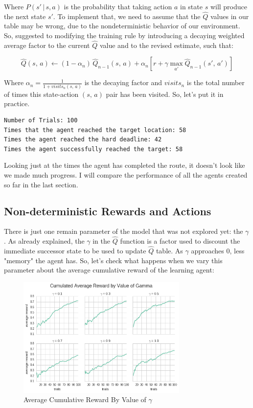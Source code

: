 \documentclass[a4paper]{article}
\begin{document}
Where $P\left(s' \,| \,s, a   \right)$ is the probability that taking action $a$ in state $s$ will produce the next state $s'$. To implement that, we need to assume that the $\hat{Q}$ values in our table may be wrong, due to the nondeterministic behavior of our environment. So, \cite{Mitchell} suggested to modifying the training rule by introducing a decaying weighted average factor to the current $\hat{Q}$ value and to the revised estimate, such that:

$$\hat{Q}(s, \, a) \leftarrow  (1 - \alpha_{n})\, \hat{Q}_{n-1}(s, \, a) +  \alpha_{n}\left[ r + \gamma \underset{a'}{\max} \hat{Q}_{n-1}(s', \, a') \right ]$$

Where $\alpha_{n} = \frac{1}{1 + visits_{n}(s, \,a)}$ is the decaying factor and $visits_{n}$ is the total number of times this state-action $(s, \, a)$ pair has been visited. So, let's put it in practice.

\begin{lstlisting}
Number of Trials: 100
Times that the agent reached the target location: 58
Times the agent reached the hard deadline: 42
Times the agent successfully reached the target: 58
\end{lstlisting}

Looking just at the times the agent has completed the route, it doesn't look like we made much progress. I will compare the performance of all the agents created so far in the last section.

\subsection{Non-deterministic Rewards and Actions}
There is just one remain parameter of the model that was not explored yet:  the $\gamma$. As already explained, the $\gamma$ in the $\hat{Q}$ function is a factor used to discount the immediate successor state to be used to update $\hat{Q}$ table. As $\gamma$ approaches $0$, less "memory" the agent has. So, let's check what happens when we vary this parameter about the average cumulative reward of the learning agent:

\begin{figure}[ht!]
\centering
\includegraphics[width=0.75\textwidth]{images/cum_reward_by_gamma.png}
\caption{\label{fig:avg_cum_rwd}Average Cumulative Reward By Value of $\gamma$}
\end{figure}
\end{document}
